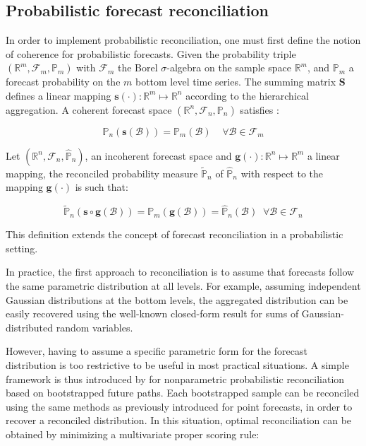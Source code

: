 \documentclass[letterpaper]{article}
\begin{document}
\subsection{Probabilistic forecast reconciliation}\label{prob_rec}

In order to implement probabilistic reconciliation, one must first define the notion of coherence for probabilistic forecasts. Given the probability triple $(\mathbb{R}^m, \mathcal{F}_m, \mathbb{P}_m)$ with $\mathcal{F}_m$ the Borel $\sigma$-algebra on the sample space $\mathbb{R}^m$, and $\mathbb{P}_m$ a forecast probability on the $m$ bottom level time series. The summing matrix $\mathbf{S}$ defines a linear mapping $\mathbf{s}(\cdot) : \mathbb{R}^m  \mapsto \mathbb{R}^n$ according to the hierarchical aggregation. A coherent forecast space $(\mathbb{R}^n, \mathcal{F}_n,\mathbb{P}_n)$ satisfies :

\begin{equation}
    \mathbb{P}_n(\mathbf{s}(\mathcal{B})) = \mathbb{P}_m(\mathcal{B}) \;\;\;\; \forall \mathcal{B}\in \mathcal{F}_m
\end{equation}

Let $(\mathbb{R}^n, \mathcal{F}_n,\hat{\mathbb{P}}_n)$, an incoherent forecast space and $\mathbf{g}(\cdot) : \mathbb{R}^n  \mapsto \mathbb{R}^m $ a linear mapping, the reconciled probability measure $\tilde{\mathbb{P}}_n$ of $\hat{\mathbb{P}}_n$ with respect to the mapping $\mathbf{g}(\cdot)$ is such that:

\begin{equation}
   \tilde{\mathbb{P}}_n(\mathbf{s} \circ \mathbf{g}(\mathcal{B})) = \mathbb{P}_m(\mathbf{g}(\mathcal{B})) = \hat{\mathbb{P}}_n(\mathcal{B}) \;\; \forall \mathcal{B}\in \mathcal{F}_n
\end{equation}

This definition extends the concept of forecast reconciliation in a probabilistic setting. 

In practice, the first approach to reconciliation is to assume that forecasts follow the same parametric distribution at all levels. For example, assuming independent Gaussian distributions at the bottom levels, the aggregated distribution can be easily recovered using the well-known closed-form result for sums of Gaussian-distributed random variables. 

However, having to assume a specific parametric form for the forecast distribution is too restrictive to be useful in most practical situations. A simple framework is thus introduced by \cite{probreconciliation}  for nonparametric probabilistic reconciliation based on bootstrapped future paths. Each bootstrapped sample can be reconciled using the same methods as previously introduced for point forecasts, in order to recover a reconciled distribution. In this situation, optimal reconciliation can be obtained by minimizing a multivariate proper scoring rule:
\end{document}
